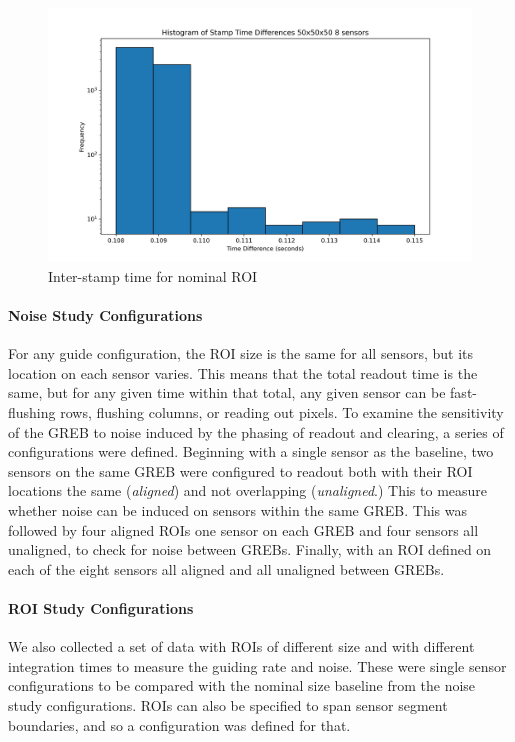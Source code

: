 \begin{figure}
    \centering
    \includegraphics[width=0.95\linewidth]{figures/guider_timing.png}
    \caption{Inter-stamp time for nominal ROI}
    \label{fig:guider_timing}
\end{figure}

\paragraph*{Noise Study Configurations}
For any guide configuration, the ROI size is the same for all sensors, but its location on each sensor varies. This means that the total readout time is the same, but for any given time within that total, any given sensor can be fast-flushing rows, flushing columns, or reading out pixels. To examine the sensitivity of the GREB to noise induced by the phasing of readout and clearing, a series of configurations were defined. Beginning with a single sensor as the baseline, two sensors on the same GREB were configured to readout both with their ROI locations the same (\textit{aligned}) and not overlapping (\textit{unaligned}.) This to measure whether noise can be induced on sensors within the same GREB. This was followed by four aligned ROIs one sensor on each GREB and four sensors all unaligned, to check for noise between GREBs. Finally, with an ROI defined on each of the eight sensors all aligned and all unaligned between GREBs.

\paragraph*{ROI Study Configurations}
We also collected a set of data with ROIs of different size and with different integration times to measure the guiding rate and noise. These were single sensor configurations to be compared with the nominal size baseline from the noise study configurations. ROIs can also be specified to span sensor segment boundaries, and so a configuration was defined for that.

